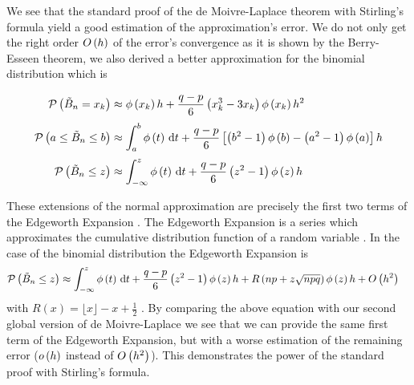 We see that the standard proof of the de Moivre-Laplace theorem with Stirling's formula yield a good estimation of the approximation's error. We do not only get the right order $O\left( {h} \right)$ of the error's convergence as it is shown by the Berry-Esseen theorem, we also derived a better approximation for the binomial distribution which is

\begin{align}
  \P{\BBs = \x}& \approx \fphi{\x} h +\frac{q-p}6 \left(\x^3-3\x\right) \fphi{\x} h^2 \nl
  \P{a \le \BBs \le b} & \approx  \int_a^b \fphi{t} \d{t} + \frac{q-p}6 \left[\br{b^2-1}\fphi{b}-\br{a^2-1}\fphi{a}\right] h \nl
  \P{\BBs \le z} & \approx \int_{-\infty}^z \fphi{t} \d{t} + \frac{q-p}6 \br{z^2-1}\fphi{z} h
\end{align}

These extensions of the normal approximation are precisely the first two terms of the Edgeworth Expansion \cite[pp. 39 ff.]{hall}\cite{wiki:edgeworth}. The Edgeworth Expansion is a series which approximates the cumulative distribution function of a random variable \cite{wiki:edgeworth}. In the case of the binomial distribution the Edgeworth Expansion is
\begin{align}
  \mathcal P\left({\tilde B_{n} \le z}\right) & \approx \int_{-\infty}^z \phi\left( {t} \right) \,\mathrm d{t} + \frac{q-p}6 \left( {z^2-1} \right)\phi\left( {z} \right) h + R\left(np + z \sqrt{npq}\right)\phi\left( {z} \right)h + O\left( {h^2} \right)
\end{align}
with $R(x)=\lfloor x \rfloor -x+\frac 12$ \cite[p. 46]{hall}. By comparing the above equation with our second global version of de Moivre-Laplace we see that we can provide the same first term of the Edgeworth Expansion, but with a worse estimation of the remaining error ($o\left( {h} \right)$ instead of $O\left( {h^2} \right)$). This demonstrates the power of the standard proof with Stirling's formula.
